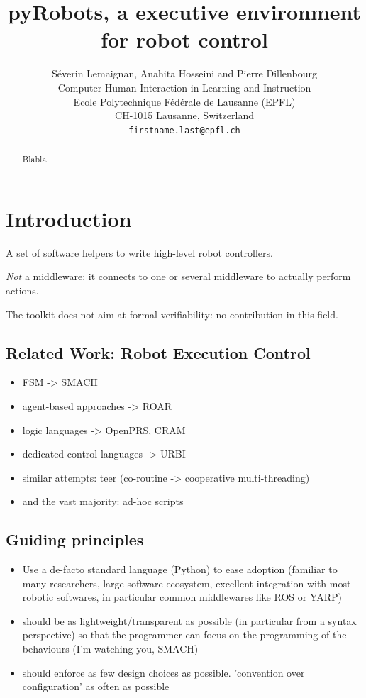\documentclass[a4paper, 10pt, conference]{ieeeconf}      %
\title{\LARGE \bf
    {\sc pyRobots}, a executive environment for robot control
}
\author{Séverin Lemaignan, Anahita Hosseini and Pierre Dillenbourg\\
Computer-Human Interaction in Learning and Instruction \\
Ecole Polytechnique Fédérale de Lausanne (EPFL) \\
CH-1015 Lausanne, Switzerland \\
{\tt\small firstname.last@epfl.ch}
}
\begin{document}
\maketitle
\thispagestyle{empty}
\pagestyle{empty}


\begin{abstract}

    Blabla

\end{abstract}


\section{Introduction}


A set of software helpers to write high-level robot controllers.

\emph{Not} a middleware: it connects to one or several middleware to actually
perform actions.

The toolkit does not aim at formal verifiability: no contribution in this field.



\subsection{Related Work: Robot Execution Control}

\begin{itemize}
    \item FSM -> SMACH
    \item agent-based approaches -> ROAR
    \item logic languages -> OpenPRS, CRAM
    \item dedicated control languages -> URBI
    \item similar attempts: teer (co-routine -> cooperative multi-threading)
    \item and the vast majority: ad-hoc scripts
\end{itemize}

\subsection{Guiding principles}

\begin{itemize}
    \item Use a de-facto standard language (Python) to ease adoption (familiar to
        many researchers, large software ecosystem, excellent integration with
        most robotic softwares, in particular common middlewares like ROS or
        YARP)
    \item should be as lightweight/transparent as possible (in particular from a
        syntax perspective) so that the
        programmer can focus on the programming of the behaviours (I'm
        watching you, SMACH)
    \item should enforce as few design choices as possible. 'convention over
        configuration' as often as possible
\end{itemize}
\end{document}

